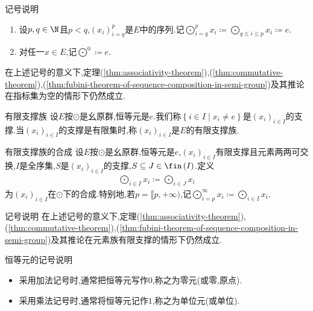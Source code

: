 \begin{remark}{记号说明}{}
	\begin{enumerate}
		\item 设$p,q\in\N$且$p<q$,$\left(x_{i}\right)_{i=q}^{p}$是$E$中的序列.记$\bigodot\limits_{i=q}^{p}x_{i}\coloneq\bigodot\limits_{q\leq i\leq p}x_{i}\coloneq e$.
		\item 对任一$x\in E$,记$\bigodot\limits^{0}\coloneq e$.
	\end{enumerate}
	在上述记号的意义下,定理(\ref{thm:associativity-theorem}),(\ref{thm:commutative-theorem}),(\ref{thm:fubini-theorem-of-sequence-composition-in-semi-group})及其推论在指标集为空的情形下仍然成立.
\end{remark}

\begin{definition}{有限支撑族}{}
	设$E$按$\odot$是幺原群,恒等元是$e$.我们称$\left\{i\in I\middle|x_{i}\neq e\right\}$是$\left(x_{i}\right)_{i\in I}$的支撑.当$\left(x_{i}\right)_{i\in I}$的支撑是有限集时,称$\left(x_{i}\right)_{i\in I}$是$E$的有限支撑族.
\end{definition}

\begin{definition}{有限支撑族的合成}{}
	设$E$按$\odot$是幺原群,恒等元是$e$,$\left(x_{i}\right)_{i\in I}$有限支撑且元素两两可交换,$I$是全序集,$S$是$\left(x_{i}\right)_{i\in I}$的支撑,$S\subseteq J\in\fin\left(I\right)$.定义
	\begin{align*}
		\bigodot\limits_{i\in I}x_{i}\coloneq\bigodot\limits_{i\in J}x_{i}
	\end{align*}
	为$\left(x_{i}\right)_{i\in I}$在$\odot$下的合成.特别地,若$p=\llbracket p,+\infty)$,记$\bigodot\limits_{i=p}^{\infty}x_{i}\coloneq\bigodot\limits_{i\in I}x_{i}$.
\end{definition}

\begin{remark}{记号说明}{}
	在上述记号的意义下,定理(\ref{thm:associativity-theorem}),(\ref{thm:commutative-theorem}),(\ref{thm:fubini-theorem-of-sequence-composition-in-semi-group})及其推论在元素族有限支撑的情形下仍然成立.
\end{remark}

\begin{remark}{恒等元的记号说明}{}
	\begin{itemize}
		\item 采用加法记号时,通常把恒等元写作$0$,称之为零元(或零,原点).
		\item 采用乘法记号时,通常将恒等元记作$1$,称之为单位元(或单位).
	\end{itemize}
\end{remark}